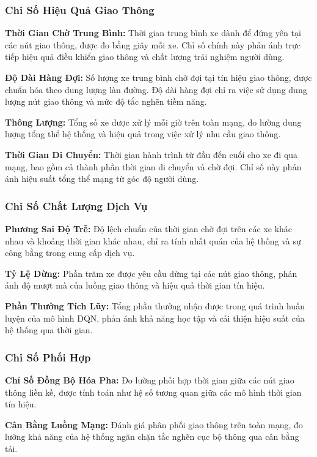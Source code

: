 \subsubsection{Chỉ Số Hiệu Quả Giao Thông}

\textbf{Thời Gian Chờ Trung Bình:} Thời gian trung bình xe dành để đứng yên tại các nút giao thông, 
được đo bằng giây mỗi xe. Chỉ số chính này phản ánh trực tiếp hiệu quả điều khiển giao thông và chất lượng 
trải nghiệm người dùng.

\textbf{Độ Dài Hàng Đợi:} Số lượng xe trung bình chờ đợi tại tín hiệu giao thông, được chuẩn hóa theo 
dung lượng làn đường. Độ dài hàng đợi chỉ ra việc sử dụng dung lượng nút giao thông và mức độ tắc nghẽn tiềm năng.

\textbf{Thông Lượng:} Tổng số xe được xử lý mỗi giờ trên toàn mạng, đo lường dung lượng tổng thể hệ thống 
và hiệu quả trong việc xử lý nhu cầu giao thông.

\textbf{Thời Gian Di Chuyển:} Thời gian hành trình từ đầu đến cuối cho xe đi qua mạng, bao gồm cả thành phần 
thời gian di chuyển và chờ đợi. Chỉ số này phản ánh hiệu suất tổng thể mạng từ góc độ người dùng.

\subsubsection{Chỉ Số Chất Lượng Dịch Vụ}

\textbf{Phương Sai Độ Trễ:} Độ lệch chuẩn của thời gian chờ đợi trên các xe khác nhau và khoảng thời gian 
khác nhau, chỉ ra tính nhất quán của hệ thống và sự công bằng trong cung cấp dịch vụ.

\textbf{Tỷ Lệ Dừng:} Phần trăm xe được yêu cầu dừng tại các nút giao thông, phản ánh độ mượt mà của luồng 
giao thông và hiệu quả thời gian tín hiệu.

\textbf{Phần Thưởng Tích Lũy:} Tổng phần thưởng nhận được trong quá trình huấn luyện của mô hình DQN, 
phản ánh khả năng học tập và cải thiện hiệu suất của hệ thống qua thời gian.

\subsubsection{Chỉ Số Phối Hợp}

\textbf{Chỉ Số Đồng Bộ Hóa Pha:} Đo lường phối hợp thời gian giữa các nút giao thông liền kề, được tính toán 
như hệ số tương quan giữa các mô hình thời gian tín hiệu.

\textbf{Cân Bằng Luồng Mạng:} Đánh giá phân phối giao thông trên toàn mạng, đo lường khả năng của hệ thống 
ngăn chặn tắc nghẽn cục bộ thông qua cân bằng tải.

